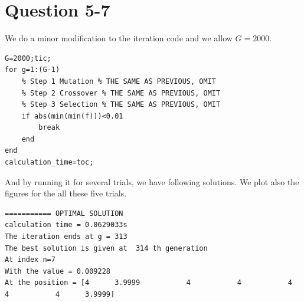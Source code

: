 \documentclass{CSArticle}[english]
\begin{document}
\section{Question 5-7}
We do a minor modification to the iteration code and we allow $G=2000$.
\begin{lstlisting}[style=MATLAB]
%% Iteration loop
G=2000;tic;
for g=1:(G-1)
    % Step 1 Mutation % THE SAME AS PREVIOUS, OMIT
    % Step 2 Crossover % THE SAME AS PREVIOUS, OMIT
    % Step 3 Selection % THE SAME AS PREVIOUS, OMIT
    if abs(min(min(f)))<0.01
        break
    end
end
calculation_time=toc;
\end{lstlisting}
And by running it for several trials, we have following solutions. We plot also the figures for the all these five trials.
\begin{lstlisting}[style=RESULT,caption={trial 1}]
=========== OPTIMAL SOLUTION
calculation time = 0.0629033s 
The iteration ends at g = 313 
The best solution is given at  314 th generation 
At index n=7 
With the value = 0.009228 
At the position = [4      3.9999           4           4           4           4           4      3.9999]
\end{lstlisting}
\end{document}
